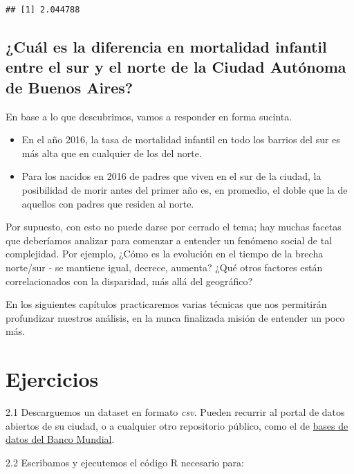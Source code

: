 \documentclass[spanish,]{book}
\begin{document}
\begin{verbatim}
## [1] 2.044788
\end{verbatim}

\hypertarget{cuuxe1l-es-la-diferencia-en-mortalidad-infantil-entre-el-sur-y-el-norte-de-la-ciudad-autuxf3noma-de-buenos-aires}{%
\subsection{¿Cuál es la diferencia en mortalidad infantil entre el sur y el norte de la Ciudad Autónoma de Buenos Aires?}\label{cuuxe1l-es-la-diferencia-en-mortalidad-infantil-entre-el-sur-y-el-norte-de-la-ciudad-autuxf3noma-de-buenos-aires}}

En base a lo que descubrimos, vamos a responder en forma sucinta.

\begin{itemize}
\item
  En el año 2016, la tasa de mortalidad infantil en todo los barrios del sur es más alta que en cualquier de los del norte.
\item
  Para los nacidos en 2016 de padres que viven en el sur de la ciudad, la posibilidad de morir antes del primer año es, en promedio, el doble que la de aquellos con padres que residen al norte.
\end{itemize}

Por supuesto, con esto no puede darse por cerrado el tema; hay muchas facetas que deberíamos analizar para comenzar a entender un fenómeno social de tal complejidad. Por ejemplo, ¿Cómo es la evolución en el tiempo de la brecha norte/sur - se mantiene igual, decrece, aumenta? ¿Qué otros factores están correlacionados con la disparidad, más allá del geográfico?

En los siguientes capítulos practicaremos varias técnicas que nos permitirán profundizar nuestros análisis, en la nunca finalizada misión de entender un poco más.

\hypertarget{ejercicios}{%
\section{Ejercicios}\label{ejercicios}}

2.1 Descarguemos un dataset en formato \emph{csv}. Pueden recurrir al portal de datos abiertos de su ciudad, o a cualquier otro repositorio público, como el de \href{https://databank.bancomundial.org/databases}{bases de datos del Banco Mundial}.

2.2 Escribamos y ejecutemos el código R necesario para:
\end{document}

